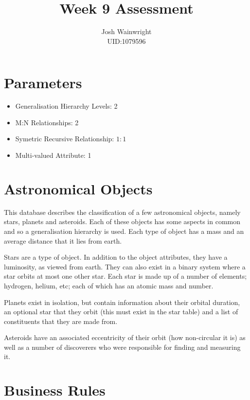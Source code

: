 \documentclass[11pt]{article} %
\author{Josh Wainwright \\ UID:1079596}
\title{Week 9 Assessment}
\date{}
\begin{document}
\maketitle
\section{Parameters}
\begin{itemize}
	\item Generalisation Hierarchy Levels: 2
	\item M:N Relationships: 2
	\item Symetric Recursive Relationship: $1:1$
	\item Multi-valued Attribute: 1
\end{itemize}

\section{Astronomical Objects}
This database describes the classification of a few astronomical objects,
namely stars, planets and asteroids. Each of these objects has some aspects in
common and so a generalisation hierarchy is used. Each type of object has a
mass and an average distance that it lies from earth.

Stars are a type of object. In addition to the object attributes, they have a
luminosity, as viewed from earth. They can also exist in a binary system where
a star orbits at most one other star. Each star is made up of a number of
elements; hydrogen, helium, etc; each of which has an atomic mass and number.

Planets exist in isolation, but contain information about their orbital
duration, an optional star that they orbit (this must exist in the star table)
and a list of constituents that they are made from.

Asteroids have an associated eccentricity of their orbit (how non-circular it
is) as well as a number of discoverers who were responsible for finding and
measuring it.

\section{Business Rules}
\label{sec:business_rules}
\end{document}
